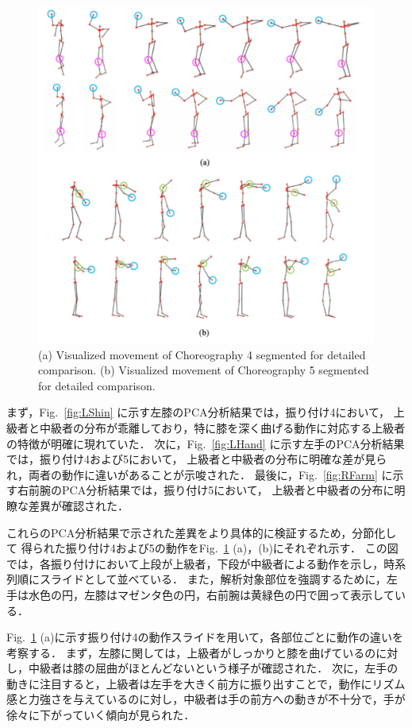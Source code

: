 \documentclass[conference]{IEEEtran}
\begin{document}
%
\begin{figure}[t]
	\centering
	\includegraphics[scale=0.4]{fig/resultmotion.pdf}
	\caption{(a) Visualized movement of Choreography 4 segmented for detailed comparison.
  (b) Visualized movement of Choreography 5 segmented for detailed comparison.}
	\label{fig:resultmotion}
	\vspace{-0.4cm}
\end{figure}
%
まず，Fig.~\ref{fig:LShin} に示す左膝のPCA分析結果では，振り付け4において，
上級者と中級者の分布が乖離しており，特に膝を深く曲げる動作に対応する上級者の特徴が明確に現れていた．
次に，Fig.~\ref{fig:LHand} に示す左手のPCA分析結果では，振り付け4および5において，
上級者と中級者の分布に明確な差が見られ，両者の動作に違いがあることが示唆された．
最後に，Fig.~\ref{fig:RFarm} に示す右前腕のPCA分析結果では，振り付け5において，
上級者と中級者の分布に明瞭な差異が確認された．

これらのPCA分析結果で示された差異をより具体的に検証するため，分節化して
得られた振り付け4および5の動作をFig.~\ref{fig:resultmotion} (a)，(b)にそれぞれ示す．
この図では，各振り付けにおいて上段が上級者，下段が中級者による動作を示し，時系列順にスライドとして並べている．
また，解析対象部位を強調するために，左手は水色の円，左膝はマゼンタ色の円，右前腕は黄緑色の円で囲って表示している．

Fig.~\ref{fig:resultmotion} (a)に示す振り付け4の動作スライドを用いて，各部位ごとに動作の違いを考察する．
まず，左膝に関しては，上級者がしっかりと膝を曲げているのに対し，中級者は膝の屈曲がほとんどないという様子が確認された．
次に，左手の動きに注目すると，上級者は左手を大きく前方に振り出すことで，動作にリズム感と力強さを与えているのに対し，中級者は手の前方への動きが不十分で，手が徐々に下がっていく傾向が見られた．
\end{document}
